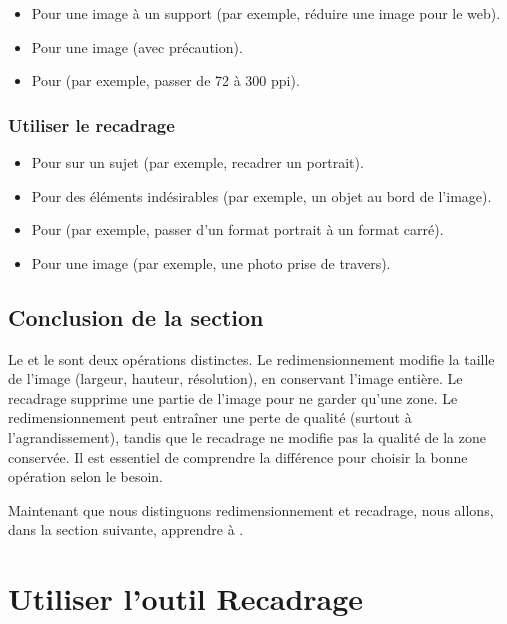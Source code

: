 \begin{itemize}
    \item Pour  une image à un support (par exemple, réduire une image pour le web).
    \item Pour  une image (avec précaution).
    \item Pour  (par exemple, passer de 72 à 300 ppi).
\end{itemize}

\subsubsection{Utiliser le recadrage}

\begin{itemize}
    \item Pour  sur un sujet (par exemple, recadrer un portrait).
    \item Pour  des éléments indésirables (par exemple, un objet au bord de l'image).
    \item Pour  (par exemple, passer d'un format portrait à un format carré).
    \item Pour  une image (par exemple, une photo prise de travers).
\end{itemize}

\subsection*{Conclusion de la section}

Le  et le  sont deux opérations distinctes. Le redimensionnement modifie la taille de l'image (largeur, hauteur, résolution), en conservant l'image entière. Le recadrage supprime une partie de l'image pour ne garder qu'une zone. Le redimensionnement peut entraîner une perte de qualité (surtout à l'agrandissement), tandis que le recadrage ne modifie pas la qualité de la zone conservée. Il est essentiel de comprendre la différence pour choisir la bonne opération selon le besoin.

Maintenant que nous distinguons redimensionnement et recadrage, nous allons, dans la section suivante, apprendre à .

\section{Utiliser l'outil Recadrage}

